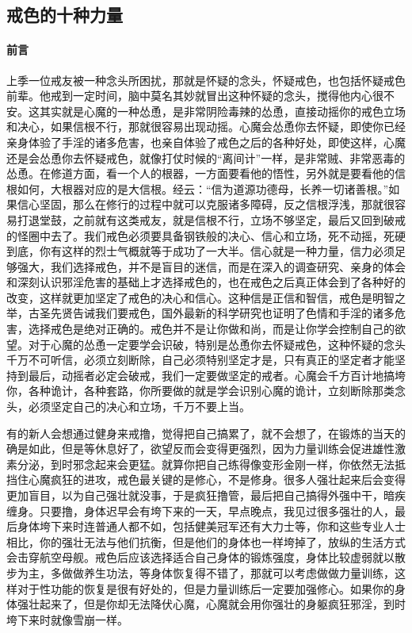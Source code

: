 \subsection{戒色的十种力量}

\paragraph*{前言}

上季一位戒友被一种念头所困扰，那就是怀疑的念头，怀疑戒色，也包括怀疑戒色前辈。他戒到一定时间，脑中莫名其妙就冒出这种怀疑的念头，搅得他内心很不安。这其实就是心魔的一种怂恿，是非常阴险毒辣的怂恿，直接动摇你的戒色立场和决心，如果信根不行，那就很容易出现动摇。心魔会怂恿你去怀疑，即使你已经亲身体验了手淫的诸多危害，也亲自体验了戒色之后的各种好处，即使这样，心魔还是会怂恿你去怀疑戒色，就像打仗时候的“离间计”一样，是非常贼、非常恶毒的怂恿。在修道方面，看一个人的根器，一方面要看他的悟性，另外就是要看他的信根如何，大根器对应的是大信根。经云：“信为道源功德母，长养一切诸善根。”如果信心坚固，那么在修行的过程中就可以克服诸多障碍，反之信根浮浅，那就很容易打退堂鼓，之前就有这类戒友，就是信根不行，立场不够坚定，最后又回到破戒的怪圈中去了。我们戒色必须要具备钢铁般的决心、信心和立场，死不动摇，死硬到底，你有这样的烈士气概就等于成功了一大半。信心就是一种力量，信力必须足够强大，我们选择戒色，并不是盲目的迷信，而是在深入的调查研究、亲身的体会和深刻认识邪淫危害的基础上才选择戒色的，也在戒色之后真正体会到了各种好的改变，这样就更加坚定了戒色的决心和信心。这种信是正信和智信，戒色是明智之举，古圣先贤告诫我们要戒色，国外最新的科学研究也证明了色情和手淫的诸多危害，选择戒色是绝对正确的。戒色并不是让你做和尚，而是让你学会控制自己的欲望。对于心魔的怂恿一定要学会识破，特别是怂恿你去怀疑戒色，这种怀疑的念头千万不可听信，必须立刻断除，自己必须特别坚定才是，只有真正的坚定者才能坚持到最后，动摇者必定会破戒，我们一定要做坚定的戒者。心魔会千方百计地搞垮你，各种诡计，各种套路，你所要做的就是学会识别心魔的诡计，立刻断除那类念头，必须坚定自己的决心和立场，千万不要上当。

有的新人会想通过健身来戒撸，觉得把自己搞累了，就不会想了，在锻炼的当天的确是如此，但是等休息好了，欲望反而会变得更强烈，因为力量训练会促进雄性激素分泌，到时邪念起来会更猛。就算你把自己练得像变形金刚一样，你依然无法抵挡住心魔疯狂的进攻，戒色最关键的是修心，不是修身。很多人强壮起来后会变得更加盲目，以为自己强壮就没事，于是疯狂撸管，最后把自己搞得外强中干，暗疾缠身。只要撸，身体迟早会有垮下来的一天，早点晚点，我见过很多强壮的人，最后身体垮下来时连普通人都不如，包括健美冠军还有大力士等，你和这些专业人士相比，你的强壮无法与他们抗衡，但是他们的身体也一样垮掉了，放纵的生活方式会击穿航空母舰。戒色后应该选择适合自己身体的锻炼强度，身体比较虚弱就以散步为主，多做做养生功法，等身体恢复得不错了，那就可以考虑做做力量训练，这样对于性功能的恢复是很有好处的，但是力量训练后一定要加强修心。如果你的身体强壮起来了，但是你却无法降伏心魔，心魔就会用你强壮的身躯疯狂邪淫，到时垮下来时就像雪崩一样。

